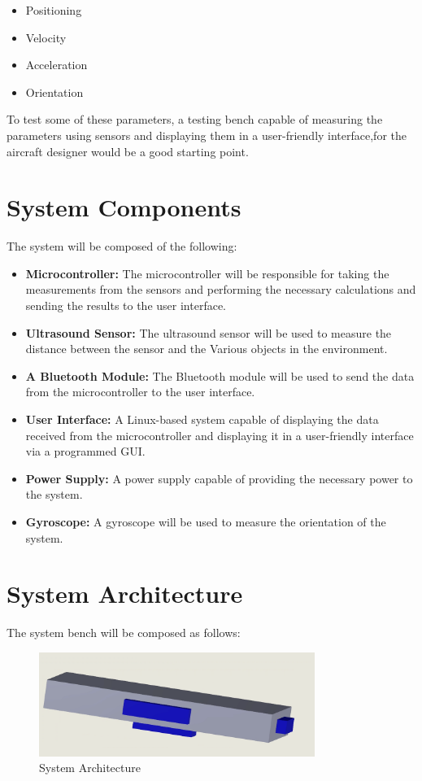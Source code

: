 \documentclass[12pt]{article}
\numberwithin{equation}{section}
\begin{document}
\begin{itemize}
  \item Positioning
  \item Velocity
  \item Acceleration
  \item Orientation
\end{itemize}

To test some of these parameters, a testing bench capable of measuring the parameters using sensors and displaying them in a user-friendly interface,for the aircraft designer would be a good starting point.

\section{System Components}
The system will be composed of the following:
\begin{itemize}
  \item \textbf{Microcontroller:} The microcontroller will be responsible for taking the measurements from the sensors and performing the necessary calculations and sending the results to the user interface.
  \item \textbf{Ultrasound Sensor:} The ultrasound sensor will be used to measure the distance between the sensor and the Various objects in the environment.
  \item \textbf{A Bluetooth Module:} The Bluetooth module will be used to send the data from the microcontroller to the user interface.
  \item \textbf{User Interface:} A Linux-based system capable of displaying the data received from the microcontroller and displaying it in a user-friendly interface via a programmed GUI.
  \item \textbf{Power Supply:} A power supply capable of providing the necessary power to the system.
  \item \textbf{Gyroscope:} A gyroscope will be used to measure the orientation of the system.
\end{itemize}

\section{System Architecture}
The system bench will be composed as follows:
\begin{figure}[H]
  \centering
  \includegraphics[width=0.8\textwidth]{Figures/Final.png}
  \caption{System Architecture}
  \label{fig:system_architecture}
\end{figure}
\end{document}
